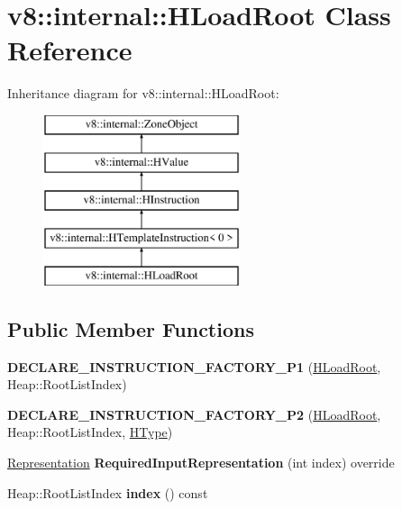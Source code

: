 \hypertarget{classv8_1_1internal_1_1_h_load_root}{}\section{v8\+:\+:internal\+:\+:H\+Load\+Root Class Reference}
\label{classv8_1_1internal_1_1_h_load_root}
Inheritance diagram for v8\+:\+:internal\+:\+:H\+Load\+Root\+:\begin{figure}[H]
\begin{center}
\leavevmode
\includegraphics[height=5.000000cm]{classv8_1_1internal_1_1_h_load_root}
\end{center}
\end{figure}
\subsection*{Public Member Functions}
\begin{DoxyCompactItemize}
\item 
{\bfseries D\+E\+C\+L\+A\+R\+E\+\_\+\+I\+N\+S\+T\+R\+U\+C\+T\+I\+O\+N\+\_\+\+F\+A\+C\+T\+O\+R\+Y\+\_\+\+P1} (\hyperlink{classv8_1_1internal_1_1_h_load_root}{H\+Load\+Root}, Heap\+::\+Root\+List\+Index)\hypertarget{classv8_1_1internal_1_1_h_load_root_a71d49e9a92e3a442ef0a130302b29d31}{}\label{classv8_1_1internal_1_1_h_load_root_a71d49e9a92e3a442ef0a130302b29d31}

\item 
{\bfseries D\+E\+C\+L\+A\+R\+E\+\_\+\+I\+N\+S\+T\+R\+U\+C\+T\+I\+O\+N\+\_\+\+F\+A\+C\+T\+O\+R\+Y\+\_\+\+P2} (\hyperlink{classv8_1_1internal_1_1_h_load_root}{H\+Load\+Root}, Heap\+::\+Root\+List\+Index, \hyperlink{classv8_1_1internal_1_1_h_type}{H\+Type})\hypertarget{classv8_1_1internal_1_1_h_load_root_a01b5408ecf7a93a97a1257ce6c0691be}{}\label{classv8_1_1internal_1_1_h_load_root_a01b5408ecf7a93a97a1257ce6c0691be}

\item 
\hyperlink{classv8_1_1internal_1_1_representation}{Representation} {\bfseries Required\+Input\+Representation} (int index) override\hypertarget{classv8_1_1internal_1_1_h_load_root_a4c421ad2909a573b4a316ad763625c8c}{}\label{classv8_1_1internal_1_1_h_load_root_a4c421ad2909a573b4a316ad763625c8c}

\item 
Heap\+::\+Root\+List\+Index {\bfseries index} () const \hypertarget{classv8_1_1internal_1_1_h_load_root_a3c448650d42c50c46b4895f8381a1ce7}{}\label{classv8_1_1internal_1_1_h_load_root_a3c448650d42c50c46b4895f8381a1ce7}

\end{DoxyCompactItemize}

